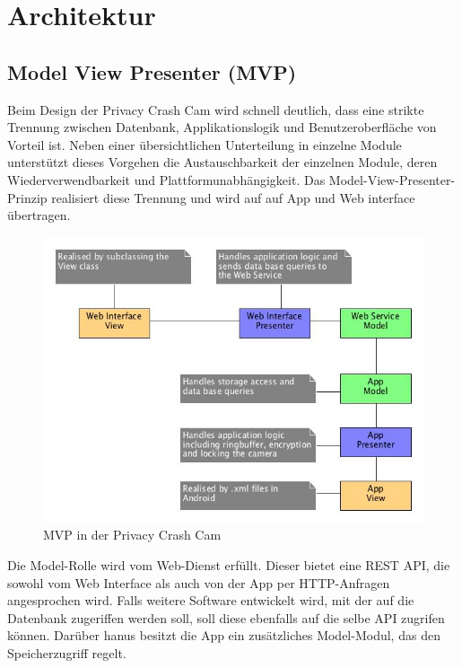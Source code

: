 \chapter{Architektur}
\section{Model View Presenter (MVP)}
Beim Design der Privacy Crash Cam wird schnell deutlich, dass eine strikte Trennung zwischen Datenbank, Applikationslogik und Benutzeroberfläche von Vorteil ist. Neben einer übersichtlichen Unterteilung in einzelne Module unterstützt dieses Vorgehen die Austauschbarkeit der einzelnen Module, deren Wiederverwendbarkeit und Plattformunabhängigkeit. Das Model-View-Presenter-Prinzip realisiert diese Trennung und wird auf auf App und Web interface übertragen.\newline\par

\begin{figure}[ht]
	\centering
\includegraphics[width=1\textwidth]{./resources/Diagramme/overview_mvp.jpg}
\caption{MVP in der Privacy Crash Cam}
	\label{fig:overview_mvp}
\end{figure}

Die Model-Rolle wird vom Web-Dienst erfüllt. Dieser bietet eine REST API, die sowohl vom Web Interface als auch von der App per HTTP-Anfragen angesprochen wird. Falls weitere Software entwickelt wird, mit der auf die Datenbank zugeriffen werden soll, soll diese ebenfalls auf die selbe API zugrifen können.\newline
Darüber hanus besitzt die App ein zusätzliches Model-Modul, das den Speicherzugriff regelt.\newline\par

